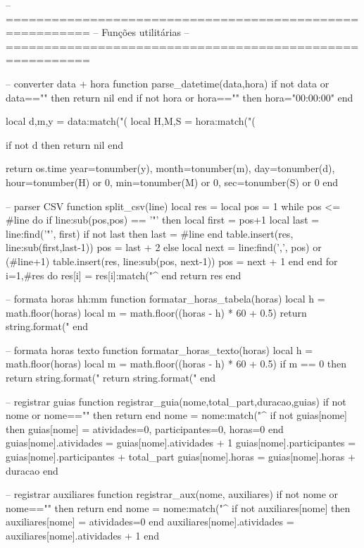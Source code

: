 \begin{luacode*}

-- =========================================================
-- Funções utilitárias
-- =========================================================

-- converter data + hora
function parse_datetime(data,hora)
  if not data or data=="" then return nil end
  if not hora or hora=="" then hora="00:00:00" end

  local d,m,y = data:match("(%
  local H,M,S = hora:match("(%

  if not d then return nil end

  return os.time{
    year=tonumber(y),
    month=tonumber(m),
    day=tonumber(d),
    hour=tonumber(H) or 0,
    min=tonumber(M) or 0,
    sec=tonumber(S) or 0
  }
end

-- parser CSV
function split_csv(line)
  local res = {}
  local pos = 1
  while pos <= #line do
    if line:sub(pos,pos) == '"' then
      local first = pos+1
      local last = line:find('"', first)
      if not last then last = #line end
      table.insert(res, line:sub(first,last-1))
      pos = last + 2
    else
      local next = line:find(',', pos) or (#line+1)
      table.insert(res, line:sub(pos, next-1))
      pos = next + 1
    end
  end
  for i=1,#res do
    res[i] = res[i]:match("^%
  end
  return res
end

-- formata horas hh:mm
function formatar_horas_tabela(horas)
  local h = math.floor(horas)
  local m = math.floor((horas - h) * 60 + 0.5)
  return string.format("%
end

-- formata horas texto
function formatar_horas_texto(horas)
  local h = math.floor(horas)
  local m = math.floor((horas - h) * 60 + 0.5)
  if m == 0 then return string.format("%
  return string.format("%
end

-- registrar guias
function registrar_guia(nome,total_part,duracao,guias)
  if not nome or nome=="" then return end
  nome = nome:match("^%
  if not guias[nome] then
    guias[nome] = {atividades=0, participantes=0, horas=0}
  end
  guias[nome].atividades = guias[nome].atividades + 1
  guias[nome].participantes = guias[nome].participantes + total_part
  guias[nome].horas = guias[nome].horas + duracao
end

-- registrar auxiliares
function registrar_aux(nome, auxiliares)
  if not nome or nome=="" then return end
  nome = nome:match("^%
  if not auxiliares[nome] then
    auxiliares[nome] = {atividades=0}
  end
  auxiliares[nome].atividades = auxiliares[nome].atividades + 1
end


\end{luacode*}
